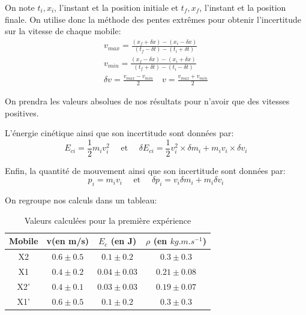 \documentclass[12pt]{article}
\begin{document}
On note $t_i, x_i$, l'instant et la position initiale et $t_f, x_f$, l'instant et la position finale. On utilise donc la méthode
des pentes extrêmes pour obtenir l'incertitude sur la vitesse de chaque mobile:
\begin{gather*}
    v_{max} = \frac{(x_f + \delta x) - (x_i - \delta x)}{(t_f - \delta t) - (t_i + \delta t)} \\
    v_{min} = \frac{(x_f - \delta x) - (x_i + \delta x)}{(t_f + \delta t) - (t_i - \delta t)} \\
    \delta v = \frac{v_{max} - v_{min}}{2} \quad v = \frac{v_{max} + v_{min}}{2}
\end{gather*}



On prendra les valeurs absolues de nos résultats pour n'avoir que des vitesses positives.	
		

L'énergie cinétique ainsi que son incertitude sont données par:
\begin{equation}
    E_{ci} = \frac{1}{2}m_iv_i^2 \quad \text{ et } \quad \delta E_{ci} = \frac{1}{2}v_i^2 \times \delta m_i + m_iv_i \times \delta v_i
\end{equation}

Enfin, la quantité de mouvement ainsi que son incertitude sont données par:
\begin{equation}
    p_i = m_iv_i \quad \text{ et } \quad \delta p_i = v_i\delta m_i + m_i\delta v_i
\end{equation}


On regroupe nos calculs dans un tableau:
\begin{table}[!h]
	\begin{center}
		\begin{tabular}{|c|c|c|c|}
		\hline
		Mobile & v(en m/s)  & $E_c$ (en J) & $\rho$ (en $kg.m.s^{-1}$) \\
		\hline
		X2 & $0.6\pm 0.5$ & $0.1\pm 0.2$ & $0.3 \pm 0.3$ \\
		\hline
		X1 & $0.4\pm 0.2$ & $0.04\pm 0.03$ & $0.21\pm 0.08$ \\
		\hline 
		X2' & $0.4\pm 0.1$ & $0.03\pm 0.03$ & $0.19\pm 0.07$\\
		\hline 
		X1' & $0.6\pm 0.5$ & $0.1\pm 0.2$ & $0.3\pm 0.3$\\
		\hline		
		\end{tabular}	
		\label{Tableau première expérience}
		\caption{Valeurs calculées pour la première expérience}
	\end{center}
\end{table}
\end{document}
